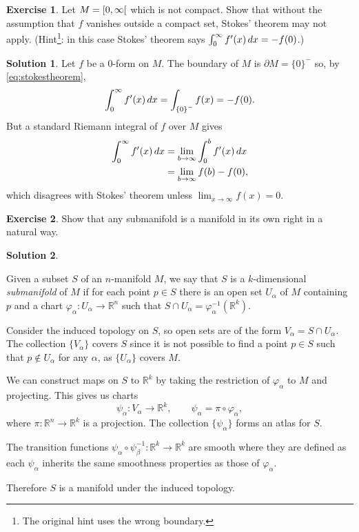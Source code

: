 \documentclass[11pt, a4paper]{report}
\theoremstyle{definition}
\newtheorem{exercise}{Exercise}[part]
\newtheorem{solution}{Solution}[part]
\newenvironment{ex}{\begin{exercise}}{\end{exercise}\pagebreak[1]}
\newenvironment{sol}{\begin{solution}}{\end{solution}\pagebreak[3]}
\renewcommand*{\d}{\ensuremath\mathop{}\mathopen{}d}
\begin{document}
\begin{ex}

Let $M = \rinterval{0}{\infty}$ which is not compact.
Show that without the assumption that $f$ vanishes outside a compact set, Stokes' theorem may not apply.
(Hint\footnote{The original hint uses the wrong boundary.}: in this case Stokes' theorem says $\int_0^\infty f'(x) \d x = -f(0)$.)

\end{ex}

\begin{sol}

Let $f$ be a 0-form on $M$.
The boundary of $M$ is $\partial M = {\{0\}}^-$ so, by \ref{eq:stokestheorem}, %
\[
    \int_0^\infty f'(x) \d x = \int_{{\{0\}}^-} f(x) = -f(0).
\]
But a standard Riemann integral of $f$ over $M$ gives
\begin{align*}
    \int_0^\infty f'(x) \d x &= \lim_{b \to \infty} \int_0^b f'(x) \d x \\
                             &= \lim_{b \to \infty} f(b) - f(0),
\end{align*}
which disagrees with Stokes' theorem unless $\displaystyle \lim_{x \to \infty} f(x) = 0$.

\end{sol}

\begin{ex}

Show that any submanifold is a manifold in its own right in a natural way.

\end{ex}

\begin{sol}\label{sol:submanifold}

Given a subset $S$ of an $n$-manifold $M$, we say that $S$ is a $k$-dimensional \emph{submanifold} of $M$ if for each point $p \in S$ there is an open set $U_\alpha$ of $M$ containing $p$ and a chart $\varphi_\alpha: U_\alpha \to \mathbb{R}^n$ such that $S \cap U_\alpha = \varphi_\alpha^{-1} (\mathbb{R}^k)$.

Consider the induced topology on $S$, so open sets are of the form $V_\alpha = S \cap U_\alpha$.
The collection $\{V_\alpha\}$ covers $S$ since it is not possible to find a point $p \in S$ such that $p \notin U_\alpha$ for any $\alpha$, as $\{U_\alpha\}$ covers $M$.

We can construct maps on $S$ to $\mathbb{R}^k$ by taking the restriction of $\varphi_\alpha$ to $M$ and projecting.
This gives us charts
\[
    \psi_\alpha: V_\alpha \to \mathbb{R}^k, \qquad
    \psi_\alpha = \pi \circ \varphi_\alpha,
\]
where $\pi: \mathbb{R}^n \to \mathbb{R}^k$ is a projection.
The collection $\{\psi_\alpha\}$ forms an atlas for $S$.

The transition functions $\psi_\alpha \circ \psi_\beta^{-1}: \mathbb{R}^k \to \mathbb{R}^k$ are smooth where they are defined as each $\psi_\alpha$ inherits the same smoothness properties as those of $\varphi_\alpha$.

Therefore $S$ is a manifold under the induced topology.

\end{sol}
\end{document}
